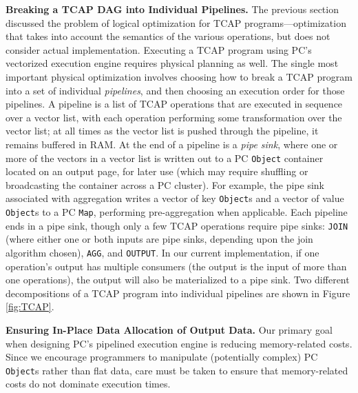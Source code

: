 \vspace{5 pt}
\noindent
\textbf{Breaking a TCAP DAG into Individual Pipelines.}
The previous section discussed the problem of logical optimization for TCAP programs---optimization that takes into account the semantics
of the various operations, but does not consider actual implementation.  
Executing a TCAP program using PC's vectorized execution engine requires physical planning as well.  The single most important physical 
optimization involves choosing how to break a TCAP program into a set of individual \emph{pipelines}, and then choosing an execution order
for those pipelines.
A pipeline is a list of TCAP operations that are executed in sequence over a vector list, with each operation performing some
transformation over the vector list; at all times as the vector list is pushed through the pipeline, it remains buffered in RAM.  
At the end of a pipeline is a \emph{pipe sink}, where one or more of the
vectors in a vector list is written out to a PC \texttt{Object}
container located on an output page, for later use (which may require shuffling or broadcasting the container across a PC cluster).  
For example, the pipe sink associated with aggregation
writes a vector of key \texttt{Object}s and a vector of value \texttt{Object}s to a PC \texttt{Map}, performing pre-aggregation when
applicable.
Each pipeline ends in a pipe sink, though only a few TCAP operations require pipe sinks: \texttt{JOIN} (where either one or both inputs are pipe
sinks, depending upon the join algorithm chosen), \texttt{AGG}, and
\texttt{OUTPUT}. In our current implementation, if one operation's
output has multiple consumers (the output is the input of more than one operations), the output will also be
materialized to a pipe sink.
Two different decompositions of a TCAP program into individual pipelines are shown in Figure \ref{fig:TCAP}.



\vspace{5 pt}
\noindent
\textbf{Ensuring In-Place Data Allocation of Output Data.}
Our primary goal when designing PC's pipelined execution engine is reducing  
memory-related costs.  
Since we 
encourage programmers to manipulate (potentially complex) PC \texttt{Object}s
rather than flat data, care must be taken to ensure that memory-related costs do
not dominate execution times.


